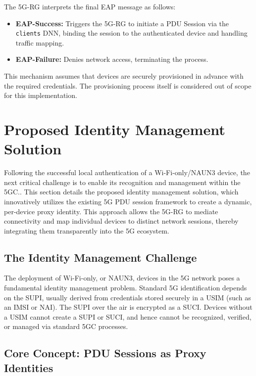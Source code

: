 The \ac{5G-RG} interprets the final \ac{EAP} message as follows:

\begin{itemize}
    \item \textbf{\ac{EAP}-Success:} Triggers the \ac{5G-RG} to initiate a \ac{PDU} Session via the \texttt{clients} \ac{DNN}, binding the session to the authenticated device and handling traffic mapping.
    \item \textbf{\ac{EAP}-Failure:} Denies network access, terminating the process.
\end{itemize}

This mechanism assumes that devices are securely provisioned in advance with the required credentials. The provisioning process itself is considered out of scope for this implementation.

\section{Proposed Identity Management Solution}

Following the successful local authentication of a Wi-Fi-only/\ac{NAUN3} device, the next critical challenge is to enable its recognition and management within the \ac{5GC}.. This section details the proposed identity management solution, which innovatively utilizes the existing \ac{5G} \ac{PDU} session framework to create a dynamic, per-device proxy identity. This approach allows the \ac{5G-RG} to mediate connectivity and map individual devices to distinct network sessions, thereby integrating them transparently into the \ac{5G} ecosystem.

\subsection{The Identity Management Challenge}

The deployment of Wi-Fi-only, or \ac{NAUN3}, devices in the \ac{5G} network poses a fundamental identity management problem. Standard \ac{5G} identification depends on the \ac{SUPI}, usually derived from credentials stored securely in a \ac{USIM} (such as an \ac{IMSI} or \ac{NAI}). The \ac{SUPI} over the air is encrypted as a \ac{SUCI}. Devices without a \ac{USIM} cannot create a \ac{SUPI} or \ac{SUCI}, and hence cannot be recognized, verified, or managed via standard \ac{5GC} processes.

\subsection{Core Concept: \acs{PDU} Sessions as Proxy Identities}

